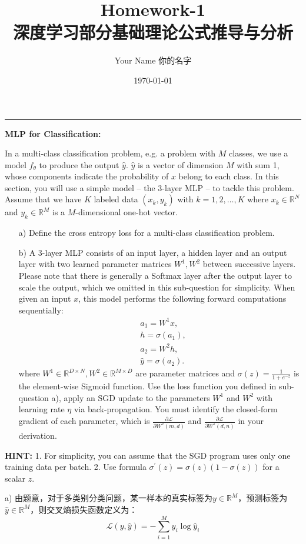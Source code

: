 \documentclass{homework}
\author{Your Name 你的名字}
\date{\today}
\title{\Large \textbf{Homework-1}\\深度学习部分基础理论公式推导与分析}
\begin{document}
 \maketitle
\rule[0ex]{\textwidth}{1.5pt}
\begin{shaded}
    \question \textbf{MLP for Classification: }
    
    In a multi-class classification problem, e.g. a problem with $M$ classes, we use a model $f_{\theta}$ to produce the output $\hat{y}$. $\hat{y}$ is a vector of dimension $M$ with sum 1, whose components indicate the probability of $x$ belong to each class.
    In this section, you will use a simple model -- the 3-layer MLP -- to tackle this problem. Assume that we have $K$ labeled data $\left(x_{k}, y_{k}\right)$ with $k=1,2, \ldots, K$ where $x_{k} \in \mathbb{R}^{N}$ and $y_{k} \in \mathbb{R}^{M}$ is a $M$-dimensional one-hot vector. 
    \begin{enumerate}
        \item[a)] Define the cross entropy loss for a multi-class classification problem.
        \item[b)] A 3-layer MLP consists of an input layer, a hidden layer and an output layer with two learned parameter matrices $W^{1}, W^{2}$ between successive layers. Please note that there is generally a Softmax layer after the output layer to scale the output, which we omitted in this sub-question for simplicity. When given an input $x$, this model performs the following forward computations sequentially:
        $$\begin{aligned}
        & a_{1}=W^{1} x, \\
        & h=\sigma\left(a_{1}\right), \\
        & a_{2}=W^{2} h, \\
        & \hat{y}=\sigma\left(a_{2}\right) .
        \end{aligned}$$
        where $W^{1} \in \mathbb{R}^{D \times N}, W^{2} \in \mathbb{R}^{M \times D}$ are parameter matrices and $\sigma(z)=\frac{1}{1+e^{-z}}$ is the element-wise Sigmoid function. Use the loss function you defined in sub-question a), apply an SGD update to the parameters $W^{1}$ and $W^{2}$ with learning rate $\eta$ via back-propagation. You must identify the closed-form gradient of each parameter, which is $\frac{\partial \mathcal{L}}{\partial W^{2}(m, d)}$ and $\frac{\partial \mathcal{L}}{\partial W^{1}(d, n)}$ in your derivation.
    \end{enumerate}
    \textbf{HINT:}
        1. For simplicity, you can assume that the SGD program uses only one training data per batch. 
        2. Use formula $\sigma^{\prime}(z)=\sigma(z)(1-\sigma(z))$ for a scalar $z$. 
\end{shaded}
a) 由题意，对于多类别分类问题，某一样本的真实标签为$y \in \mathbb{R}^M$，预测标签为$\hat{y} \in \mathbb{R}^M$，则交叉熵损失函数定义为：
$$\mathcal{L}(y, \hat{y})=-\sum_{i=1}^{M} y_i \log \hat{y}_i$$
\end{document}
